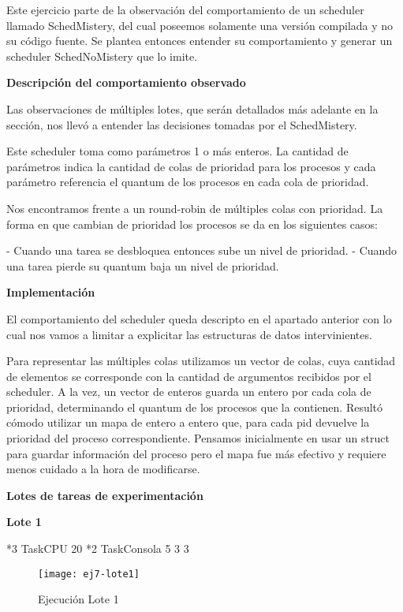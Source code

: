 Este ejercicio parte de la observación del comportamiento de un scheduler llamado SchedMistery, del cual poseemos solamente una versión compilada y no su código fuente. Se plantea entonces entender su comportamiento y generar un scheduler SchedNoMistery que lo imite.

\bigskip

\textbf{Descripción del comportamiento observado}

Las observaciones de múltiples lotes, que serán detallados más adelante en la sección, nos llevó a entender las decisiones tomadas por el SchedMistery.

Este scheduler toma como parámetros 1 o más enteros. La cantidad de parámetros indica la cantidad de colas de prioridad para los procesos y cada parámetro
referencia el quantum de los procesos en cada cola de prioridad.

Nos encontramos frente a un round-robin de múltiples colas con prioridad. La forma en que cambian de prioridad los procesos se da en los siguientes casos:

- Cuando una tarea se desbloquea entonces sube un nivel de prioridad.
- Cuando una tarea pierde su quantum baja un nivel de prioridad.


\textbf{Implementación}

El comportamiento del scheduler queda descripto en el apartado anterior con lo cual nos vamos a limitar a explicitar las estructuras de datos intervinientes.

Para representar las múltiples colas utilizamos un vector de colas, cuya cantidad de elementos se corresponde con la cantidad de argumentos recibidos por el scheduler.
A la vez, un vector de enteros guarda un entero por cada cola de prioridad, determinando el quantum de los procesos que la contienen.
Resultó cómodo utilizar un mapa de entero a entero que, para cada pid devuelve la prioridad del proceso correspondiente.
Pensamos inicialmente en usar un struct para guardar información del proceso pero el mapa fue más efectivo y requiere menos cuidado a la hora de modificarse.

\bigskip

\textbf{Lotes de tareas de experimentación}

\bigskip

\textbf{Lote 1}

*3 TaskCPU 20
*2 TaskConsola 5 3 3

\begin{figure}[h]
    \texttt{[image: ej7-lote1]}
    \caption{Ejecución Lote 1}
    \label{Lote1}
\end{figure}

